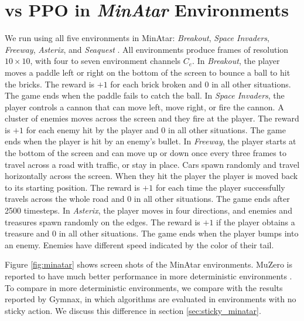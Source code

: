 \section{\moozi vs PPO in \textit{MinAtar} Environments} \label{sec:exp:minatar}
We run \moozi using all five environments in MinAtar: \textit{Breakout}, \textit{Space Invaders}, \textit{Freeway}, \textit{Asterix}, and \textit{Seaquest} \cite{MinAtarAtariInspiredTestbed_Young.Tian_2019}.
All environments produce frames of resolution $10 \times 10$, with four to seven environment channels $C_e$.
In \textit{Breakout}, the player moves a paddle left or right on the bottom of the screen to bounce a ball to hit the bricks.
The reward is $+1$ for each brick broken and $0$ in all other situations.
The game ends when the paddle fails to catch the ball.
In \textit{Space Invaders}, the player controls a cannon that can move left, move right, or fire the cannon.
A cluster of enemies moves across the screen and they fire at the player.
The reward is $+1$ for each enemy hit by the player and $0$ in all other situations.
The game ends when the player is hit by an enemy's bullet.
In \textit{Freeway}, the player starts at the bottom of the screen and can move up or down once every three frames to travel across a road with traffic, or stay in place.
Cars spawn randomly and travel horizontally across the screen.
When they hit the player the player is moved back to its starting position.
The reward is $+1$ for each time the player successfully travels across the whole road and $0$ in all other situations.
The game ends after 2500 timesteps.
In \textit{Asterix}, the player moves in four directions, and enemies and treasures spawn randomly on the edges.
The reward is $+1$ if the player obtains a treasure and $0$ in all other situations.
The game ends when the player bumps into an enemy.
Enemies have different speed indicated by the color of their tail.



Figure \ref{fig:minatar} shows screen shots of the MinAtar environments.
MuZero is reported to have much better performance in more deterministic environments \cite{VectorQuantizedModels_Ozair.Li.ea_2021}.
To compare \moozi in more deterministic environments, we compare with the results reported by Gymnax, in which algorithms are evaluated in environments with no sticky action.
We discuss this difference in section \ref{sec:sticky_minatar}.

